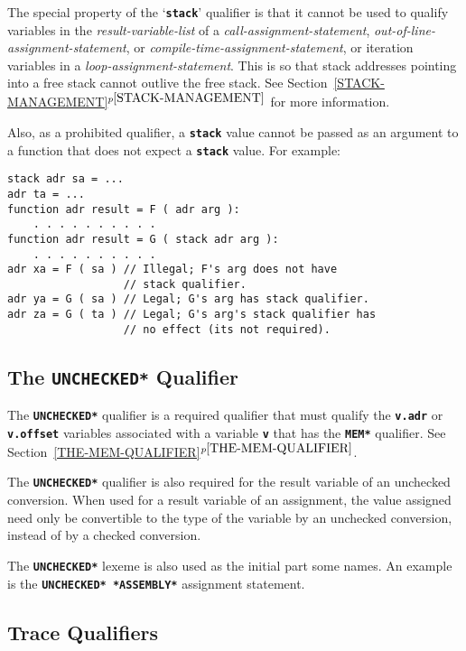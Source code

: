 \documentclass[12pt]{article}
\newcommand{\TT}[1]{{\tt \bfseries #1}}
\newcommand{\itemref}[1]{\ref{#1}$^{p\pageref{#1}}$}
\newenvironment{indpar}[1][0.3in]%
	{\begin{list}{}%
		     {\setlength{\itemsep}{0in}%
		      \setlength{\topsep}{0in}%
		      \setlength{\parsep}{1ex}%
		      \setlength{\labelwidth}{#1}%
		      \setlength{\leftmargin}{#1}%
		      \addtolength{\leftmargin}{\labelsep}}%
	 \item}%
	{\end{list}}
\begin{document}
The special property of the `\TT{stack}' qualifier is that it cannot
be used to qualify variables in the {\em result-variable-list}
of a {\em call-assignment-statement},
{\em out-of-line-assignment-statement}, or
{\em compile-time-assignment-statement},
or iteration variables in a {\em loop-assignment-statement}.
This is so that stack addresses pointing into a free stack
cannot outlive the free stack.
See Section~\itemref{STACK-MANAGEMENT} for more information.

Also, as a prohibited qualifier, a \TT{stack} value cannot be
passed as an argument to a function that does not expect a
\TT{stack} value.  For example:
\begin{indpar}\begin{verbatim}
stack adr sa = ...
adr ta = ...
function adr result = F ( adr arg ):
    . . . . . . . . . .
function adr result = G ( stack adr arg ):
    . . . . . . . . . .
adr xa = F ( sa ) // Illegal; F's arg does not have
                  // stack qualifier.
adr ya = G ( sa ) // Legal; G's arg has stack qualifier.
adr za = G ( ta ) // Legal; G's arg's stack qualifier has
                  // no effect (its not required).
\end{verbatim}\end{indpar}

\subsection{The \TT{*UNCHECKED*} Qualifier}
\label{THE-UNCHECKED-QUALIFIER}

The \TT{*UNCHECKED*} qualifier is a
required qualifier that must qualify the \TT{v.adr} or
\TT{v.offset} variables
associated with a variable \TT{v} that has the \TT{*MEM*} qualifier.
See Section~\itemref{THE-MEM-QUALIFIER}.

The \TT{*UNCHECKED*} qualifier is also required for the result variable
of an unchecked conversion.  When used for a result variable of an
assignment, the value assigned need only be convertible to the type
of the variable by an unchecked conversion, instead of by a checked
conversion.

The \TT{*UNCHECKED*} lexeme is also used as the initial part some
names. An example is the \TT{*UNCHECKED* *ASSEMBLY*} assignment statement.

\subsection{Trace Qualifiers}
\label{TRACE-QUALIFIERS}
\end{document}
